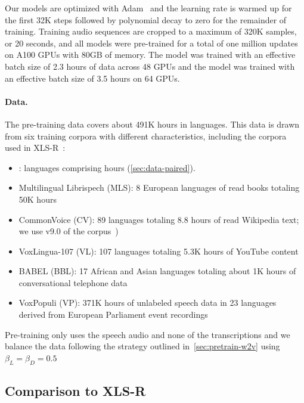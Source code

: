 Our models are optimized with Adam~\citep{kingma2015adam} and the learning rate is warmed up for the first 32K steps followed by polynomial decay to zero for the remainder of training. 
Training audio sequences are cropped to a maximum of 320K samples, or 20 seconds, and all models were pre-trained for a total of one million updates on A100 GPUs with 80GB of memory.
The  model was trained with an effective batch size of 2.3 hours of data across 48 GPUs and the  model was trained with an effective batch size of 3.5 hours on 64 GPUs.

\paragraph{Data.}
The pre-training data covers about 491K hours in \numptlang{} languages. 
This data is drawn from six training corpora with different characteristics, including the corpora used in XLS-R~\citep{babu22_interspeech}: 


\begin{itemize}
    \item \MMSU: \nummmsulang{} languages comprising \nummmsuhrs{} hours (\textsection\ref{sec:data-paired}). 
    \item Multilingual Librispech (MLS): 8 European languages of read books totaling 50K hours~\citep{pratap2020mls}
    \item CommonVoice (CV): 89 languages totaling 8.8 hours of read Wikipedia text; we use v9.0 of the corpus~\citep{ardila2019common})
    \item VoxLingua-107 (VL): 107 languages totaling 5.3K hours of YouTube content~\citep{valk2020voxlingua}
    \item BABEL (BBL): 17 African and Asian languages totaling about 1K hours of conversational telephone data~\citep{gales2014babel}
    \item VoxPopuli (VP): 371K hours of unlabeled speech data in 23 languages derived from European Parliament event recordings~\citep{wang2021voxpopuli}

\end{itemize}

Pre-training only uses the speech audio and none of the transcriptions and we balance the data following the strategy outlined in~\textsection\ref{sec:pretrain-w2v} using $\beta_L = \beta_D = 0.5$


\subsection{Comparison to XLS-R}
\label{sec:pretrain-results}

